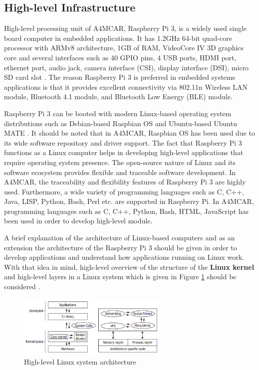 \subsection{High-level Infrastructure} \label{hlinfrasection}
High-level processing unit of A4MCAR, Raspberry Pi 3, is a widely used single board computer in embedded applications. It has 1.2GHz 64-bit quad-core processor with ARMv8 architecture, 1GB of RAM, VideoCore IV 3D graphics core and several interfaces such as 40 GPIO pins, 4 USB ports, HDMI port, ethernet port, audio jack, camera interface (CSI), display interface (DSI), micro SD card slot \cite{raspberrypiinfo}. The reason Raspberry Pi 3 is preferred in embedded systems applications is that it provides excellent connectivity via 802.11n Wireless LAN module, Bluetooth 4.1 module, and Bluetooth Low Energy (BLE) module. 

Raspberry Pi 3 can be booted with modern Linux-based operating system distributions such as Debian-based Raspbian OS \cite{raspbiandownload} and Ubuntu-based Ubuntu MATE\cite{ubuntumatedownload} \cite{raspberrypiinfo}. It should be noted that in A4MCAR, Raspbian OS has been used due to its wide software repository and driver support. The fact that Raspberry Pi 3 functions as a Linux computer helps in developing high-level applications that require operating system presence. The open-source nature of Linux and its software ecosystem provides flexible and traceable software development. In A4MCAR, the traceability and flexibility features of Raspberry Pi 3 are highly used. Furthermore, a wide variety of programming languages such as C, C++, Java, LISP, Python, Bash, Perl etc. are supported in Raspberry Pi. In A4MCAR, programming languages such as C, C++, Python, Bash, HTML, JavaScript has been used in order to develop high-level module.

A brief explanation of the architecture of Linux-based computers and as an extension the architecture of the Raspberry Pi 3 should be given in order to develop applications and understand how applications running on Linux work. With that idea in mind, high-level overview of the structure of  the \textbf{Linux kernel} and high-level layers in a Linux system which is given in Figure \ref{fig:linuxarchitecture} should be considered \cite{linuxkernelbook}.
\begin{figure}[!ht]
	\centering
	\includegraphics[width=0.65\textwidth]{content/images/linuxarchitecture.png}
	\caption{High-level Linux system architecture \cite{linuxkernelbook}}
	\label{fig:linuxarchitecture}
\end{figure}

